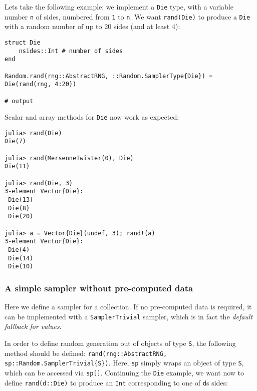 Let{\textquotesingle}s take the following example: we implement a \texttt{Die} type, with a variable number \texttt{n} of sides, numbered from \texttt{1} to \texttt{n}. We want \texttt{rand(Die)} to produce a \texttt{Die} with a random number of up to 20 sides (and at least 4):




\begin{verbatim}
struct Die
    nsides::Int # number of sides
end

Random.rand(rng::AbstractRNG, ::Random.SamplerType{Die}) = Die(rand(rng, 4:20))

# output

\end{verbatim}



Scalar and array methods for \texttt{Die} now work as expected:




\begin{verbatim}
julia> rand(Die)
Die(7)

julia> rand(MersenneTwister(0), Die)
Die(11)

julia> rand(Die, 3)
3-element Vector{Die}:
 Die(13)
 Die(8)
 Die(20)

julia> a = Vector{Die}(undef, 3); rand!(a)
3-element Vector{Die}:
 Die(4)
 Die(14)
 Die(10)
\end{verbatim}



\hypertarget{14351717451744151937}{}


\subsubsection{A simple sampler without pre-computed data}



Here we define a sampler for a collection. If no pre-computed data is required, it can be implemented with a \texttt{SamplerTrivial} sampler, which is in fact the \emph{default fallback for values}.



In order to define random generation out of objects of type \texttt{S}, the following method should be defined: \texttt{rand(rng::AbstractRNG, sp::Random.SamplerTrivial\{S\})}. Here, \texttt{sp} simply wraps an object of type \texttt{S}, which can be accessed via \texttt{sp[]}. Continuing the \texttt{Die} example, we want now to define \texttt{rand(d::Die)} to produce an \texttt{Int} corresponding to one of \texttt{d}{\textquotesingle}s sides:




